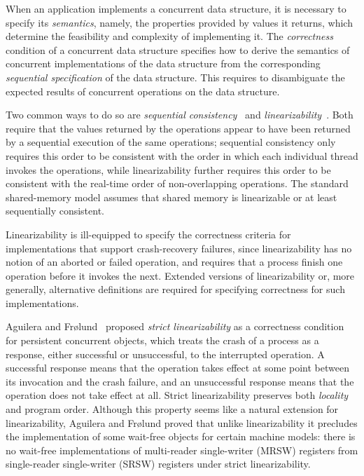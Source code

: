 When an application implements a concurrent data structure, it is necessary to specify its \emph{semantics}, namely, the properties provided by values it returns, which determine the feasibility and complexity of implementing it. The \emph{correctness} condition of a concurrent data structure specifies how to derive the semantics of concurrent implementations of the data structure from the corresponding \emph{sequential specification} of the data structure. This requires to disambiguate the expected results of concurrent operations on the data structure.

Two common ways to do so are \emph{sequential consistency}~\cite{LamportSC} and \emph{linearizability}~\cite{herlihyWingLinearizability}. Both require that the values returned by the operations appear to have been returned by a sequential execution of the same operations; sequential consistency only requires this order to be consistent with the order in which each individual thread invokes the operations, while linearizability further requires this order to be consistent with the real-time order of non-overlapping operations. The standard shared-memory model assumes that shared memory is linearizable or at least sequentially consistent.

Linearizability is ill-equipped to specify the correctness criteria for implementations that support crash-recovery failures, since linearizability has no notion of an aborted or failed operation, and requires that a process finish one operation before it invokes the next. Extended versions of linearizability or, more generally, alternative definitions are required for specifying correctness for such implementations.

Aguilera and Fr{\o}lund~\cite{Aguilera2003StrictLA} proposed \emph{strict linearizability} as a correctness condition for persistent concurrent objects,
which treats the crash of a process as a response, either successful or unsuccessful, to the interrupted operation. A successful response means that the operation takes effect at some point between its invocation and the crash failure, and an unsuccessful response means that the operation does not take effect at all.
Strict linearizability preserves both \emph{locality}~\cite{herlihy91waitfree}
and program order. Although this property seems like a natural extension for linearizability, Aguilera and Fr{\o}lund proved that unlike linearizability it precludes the implementation of some wait-free objects for certain machine models:
there is no wait-free implementations of multi-reader single-writer (MRSW) registers from single-reader single-writer (SRSW) registers under strict linearizability.

